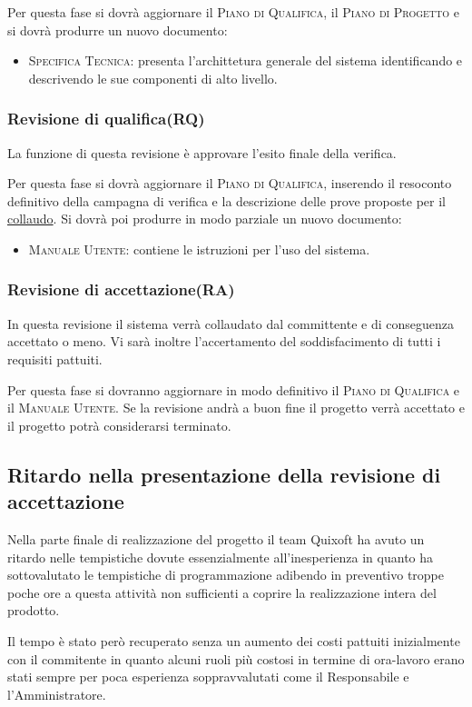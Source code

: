 \documentclass[11pt,a4paper]{article}
\begin{document}
Per questa fase si dovrà aggiornare il \textsc{Piano di Qualifica}, il \textsc{Piano di Progetto} e si dovrà produrre un nuovo documento:
\begin{itemize}
\item \textsc{Specifica Tecnica}: presenta l'archittetura generale del sistema identificando e descrivendo le sue componenti di alto livello.
\end{itemize}
\subsubsection{Revisione di qualifica(RQ)}
La funzione di questa revisione è approvare l'esito finale della verifica.

Per questa fase si dovrà aggiornare il \textsc{Piano di Qualifica}, inserendo il resoconto definitivo della campagna di verifica e la descrizione delle prove proposte per il \underline{collaudo}. Si dovrà poi produrre in modo parziale un nuovo documento:
\begin{itemize}
\item \textsc{Manuale Utente}: contiene le istruzioni per l'uso del sistema.
\end{itemize}
\subsubsection{Revisione di accettazione(RA)}
In questa revisione il sistema verrà collaudato dal committente e di conseguenza accettato o meno.
Vi sarà inoltre l'accertamento del soddisfacimento di tutti i requisiti pattuiti.

Per questa fase si dovranno aggiornare in modo definitivo il \textsc{Piano di Qualifica} e il \textsc{Manuale Utente}.
Se la revisione andrà a buon fine il progetto verrà accettato e il progetto potrà considerarsi terminato.
\subsection{Ritardo nella presentazione della revisione di accettazione}
Nella parte finale di realizzazione del progetto il team Quixoft ha avuto un ritardo nelle tempistiche dovute essenzialmente all'inesperienza in quanto ha sottovalutato le tempistiche di programmazione adibendo in preventivo troppe poche ore a questa attività non sufficienti a coprire la realizzazione intera del prodotto.

Il tempo è stato però recuperato senza un aumento dei costi pattuiti inizialmente con il commitente in quanto alcuni ruoli più costosi in termine di ora-lavoro erano stati sempre per poca esperienza soppravvalutati come il Responsabile e l'Amministratore.
\bigskip
\end{document}
